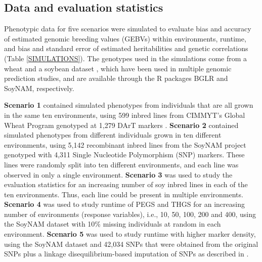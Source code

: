 \documentclass{bmcart}
\begin{document}
\subsection{Data and evaluation statistics}

Phenotypic data for five scenarios were simulated to evaluate bias and accuracy of estimated genomic breeding values (GEBVs) within environments, runtime, and bias and standard error of estimated heritabilities and genetic correlations (Table \ref{SIMULATIONS}). The genotypes used in the simulations come from a wheat \cite{WheatData1,WheatData2,WheatData3,WheatData4} and a soybean dataset \cite{soynam3,soynam4,Xavier2021}, which have been used in multiple genomic prediction studies, and are available through the R packages BGLR and SoyNAM, respectively.

\textbf{Scenario 1} contained simulated phenotypes from individuals that are all grown in the same ten environments, using 599 inbred lines from CIMMYT's Global Wheat Program \cite{WheatData1,WheatData2} genotyped at 1,279 DArT markers \cite{DArT}. \textbf{Scenario 2} contained simulated phenotypes from different individuals grown in ten different environments, using 5,142 recombinant inbred lines from the SoyNAM project \cite{soynam1,soynam2} genotyped with 4,311 Single Nucleotide Polymorphism (SNP) markers.  These lines were randomly split into ten different environments, and each line was observed in only a single environment. \textbf{Scenario 3} was used to study the evaluation statistics for an increasing number of soy inbred lines in each of the ten environments. Thus, each line could be present in multiple environments. \textbf{Scenario 4} was used to study runtime of PEGS and THGS for an increasing number of environments (response variables), i.e., 10, 50, 100, 200 and 400, using the SoyNAM dataset with 10\% missing individuals at random in each environment. \textbf{Scenario 5} was used to study runtime with higher marker density, using the SoyNAM dataset and 42,034 SNPs that were obtained from the original SNPs plus a linkage disequilibrium-based imputation of SNPs as described in \cite{soynam2}.
\end{document}
